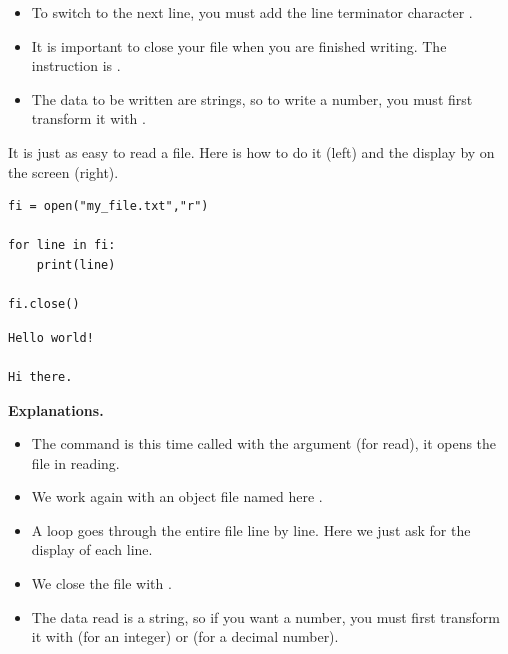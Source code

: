 \documentclass[11pt,class=report,crop=false]{standalone}
\begin{document}
\begin{cours}
\begin{itemize}
  \item To switch to the next line, you must add the line terminator character .
  
  \item It is important to close your file when you are finished writing. The instruction is . 
   
  \item The data to be written are strings, so to write a number, you must first transform it with .
\end{itemize}
  
  
\end{cours}


\begin{cours}

It is just as easy to read a file.
Here is how to do it (left) and the display by \Python{} on the screen (right).
\begin{center}
\begin{minipage}{0.5\textwidth}
\begin{lstlisting}
fi = open("my_file.txt","r")

for line in fi:
    print(line)

fi.close()
\end{lstlisting}
\end{minipage}
\begin{minipage}{0.3\textwidth}
\begin{lstlisting}
Hello world!

Hi there.
\end{lstlisting}
\end{minipage}
\end{center}

\textbf{Explanations.}
\begin{itemize}
  \item The command  is this time called with the argument  (for read), it opens the file in reading.
  
  \item We work again with an object file named here .
  
  \item A loop goes through the entire file line by line. Here we just ask for the display of each line.
  
  \item We close the file with .  
  
  \item The data read is a string, so if you want a number, you must first transform it with  (for an integer) or  
   (for a decimal number).

\end{itemize}
  
\end{cours}
\end{document}
